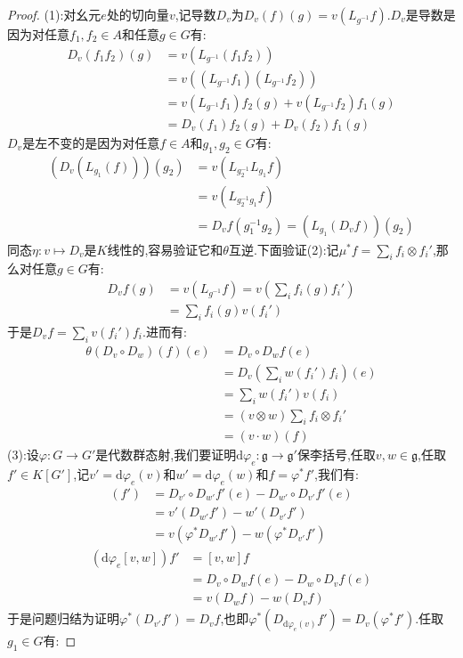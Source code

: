 \begin{enumerate}
\begin{proof}
		(1):对幺元$e$处的切向量$v$,记导数$D_v$为$D_v(f)(g)=v(L_{g^{-1}}f)$.$D_v$是导数是因为对任意$f_1,f_2\in A$和任意$g\in G$有:
		\begin{align*}
			D_v(f_1f_2)(g)&=v(L_{g^{-1}}(f_1f_2))\\&=v((L_{g^{-1}}f_1)(L_{g^{-1}}f_2))\\&=v(L_{g^{-1}}f_1)f_2(g)+v(L_{g^{-1}}f_2)f_1(g)\\&=D_v(f_1)f_2(g)+D_v(f_2)f_1(g)
		\end{align*}
		$D_v$是左不变的是因为对任意$f\in A$和$g_1,g_2\in G$有:
		\begin{align*}
			(D_v(L_{g_1}(f)))(g_2)&=v(L_{g_2^{-1}}L_{g_1}f)\\&=v(L_{g_2^{-1}g_1}f)\\&=D_vf(g_1^{-1}g_2)=(L_{g_1}(D_vf))(g_2)
		\end{align*}
		同态$\eta:v\mapsto D_v$是$K$线性的,容易验证它和$\theta$互逆.下面验证(2):记$\mu^*f=\sum_if_i\otimes f_i'$,那么对任意$g\in G$有:
		\begin{align*}
			D_vf(g)&=v(L_{g^{-1}}f)=v(\sum_if_i(g)f_i')\\&=\sum_if_i(g)v(f_i')
		\end{align*}
		于是$D_vf=\sum_iv(f_i')f_i$.进而有:
		\begin{align*}
			\theta(D_v\circ D_w)(f)(e)&=D_v\circ D_wf(e)\\&=D_v(\sum_iw(f_i')f_i)(e)\\&=\sum_iw(f_i')v(f_i)\\&=(v\otimes w)\sum_if_i\otimes f_i'\\&=(v\cdot w)(f)
		\end{align*}
		(3):设$\varphi:G\to G'$是代数群态射,我们要证明$\mathrm{d}\varphi_e:\mathfrak{g}\to\mathfrak{g}'$保李括号,任取$v,w\in\mathfrak{g}$,任取$f'\in K[G']$,记$v'=\mathrm{d}\varphi_e(v)$和$w'=\mathrm{d}\varphi_e(w)$和$f=\varphi^*f'$,我们有:
		\begin{align*}
			[v',w'](f')&=D_{v'}\circ D_{w'}f'(e)-D_{w'}\circ D_{v'}f'(e)\\&=v'(D_{w'}f')-w'(D_{v'}f')\\&=v(\varphi^*D_{w'}f')-w(\varphi^*D_{v'}f')
		\end{align*}
	    \begin{align*}
	    	(\mathrm{d}\varphi_e[v,w])f'&=[v,w]f\\&=D_v\circ D_wf(e)-D_w\circ D_vf(e)\\&=v(D_wf)-w(D_vf)
	    \end{align*}
	    于是问题归结为证明$\varphi^*(D_{v'}f')=D_vf$,也即$\varphi^*(D_{\mathrm{d}\varphi_e(v)}f')=D_v(\varphi^*f')$.任取$g_1\in G$有:

\end{proof}
\end{enumerate}
